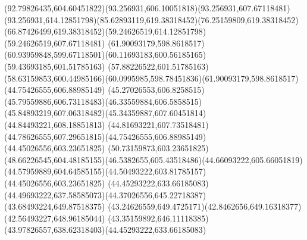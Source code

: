{{\curveto(92.79826435,604.60451822)(93.256931,606.10051818)(93.256931,607.67118481)
\curveto(93.256931,614.12851798)(85.62893119,619.38318452)(76.25159809,619.38318452)
\curveto(66.87426499,619.38318452)(59.24626519,614.12851798)(59.24626519,607.67118481)
\moveto(61.90093179,598.8618517)
\curveto(60.93959848,599.67118501)(60.11693183,600.56185165)(59.43693185,601.51785163)
\lineto(57.88226522,601.51785163)
\curveto(58.63159853,600.44985166)(60.0995985,598.78451836)(61.90093179,598.8618517)
\moveto(44.75426555,606.88985149)
\curveto(45.27026553,606.8258515)(45.79559886,606.73118483)(46.33559884,606.5858515)
\curveto(45.84893219,607.06318482)(45.34359887,607.60451814)(44.84493221,608.18851813)
\curveto(44.81693221,607.73518481)(44.78626555,607.29651815)(44.75426555,606.88985149)
\moveto(44.45026556,603.23651825)
\lineto(50.73159873,603.23651825)
\curveto(48.66226545,604.48185155)(46.5382655,605.43518486)(44.66093222,605.66051819)
\curveto(44.57959889,604.64585155)(44.50493222,603.81785157)(44.45026556,603.23651825)
\moveto(44.45293222,633.66185083)
\curveto(44.49693222,637.58585073)(44.37026556,645.22718387)(43.68493224,649.87518375)
\curveto(43.24626559,649.4725171)(42.8462656,649.16318377)(42.56493227,648.96185044)
\curveto(43.35159892,646.11118385)(43.97826557,638.62318403)(44.45293222,633.66185083)
}
}

{
}

